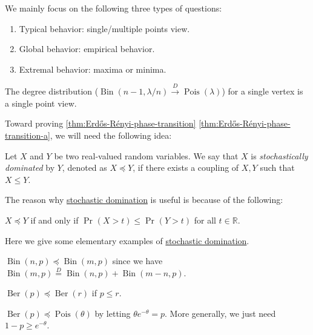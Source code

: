 \begin{prev}
	We mainly focus on the following three types of questions:
	\begin{enumerate}
		\item Typical behavior: single/multiple points view.
		\item Global behavior: empirical behavior.
		\item Extremal behavior: maxima or minima.
	\end{enumerate}
	The degree distribution (\(\operatorname{Bin}(n - 1, \lambda / n) \overset{D}{\to} \operatorname{Pois}(\lambda ) \)) for a single vertex is a single point view.
\end{prev}

Toward proving \autoref{thm:Erdős-Rényi-phase-transition} \autoref{thm:Erdős-Rényi-phase-transition-a}, we will need the following idea:

\begin{definition}\label{def:stochastic-domination}
	Let \(X\) and \(Y\) be two real-valued random variables. We say that \(X\) is \emph{stochastically dominated} by \(Y\), denoted as \(X \preceq Y\), if there exists a coupling of \(X, Y\) such that \(X \leq Y\).
\end{definition}

The reason why \hyperref[def:stochastic-domination]{stochastic domination} is useful is because of the following:

\begin{exercise}
	\(X \preceq Y\) if and only if \(\Pr_{}(X > t) \leq \Pr_{}(Y > t) \) for all \(t \in \mathbb{R} \).
\end{exercise}

Here we give some elementary examples of \hyperref[def:stochastic-domination]{stochastic domination}.

\begin{eg}
	\(\operatorname{Bin}(n, p) \preceq \operatorname{Bin}(m, p) \) since we have \(\operatorname{Bin}(m, p) \overset{D}{=} \operatorname{Bin}(n, p) + \operatorname{Bin}(m - n, p)\).
\end{eg}

\begin{eg}
	\(\operatorname{Ber}(p) \preceq \operatorname{Ber}(r) \) if \(p \leq r\).
\end{eg}

\begin{eg}
	\(\operatorname{Ber}(p) \preceq \operatorname{Pois}(\theta ) \) by letting \(\theta e^{-\theta } = p\). More generally, we just need \(1 - p \geq e^{-\theta }\).
\end{eg}


